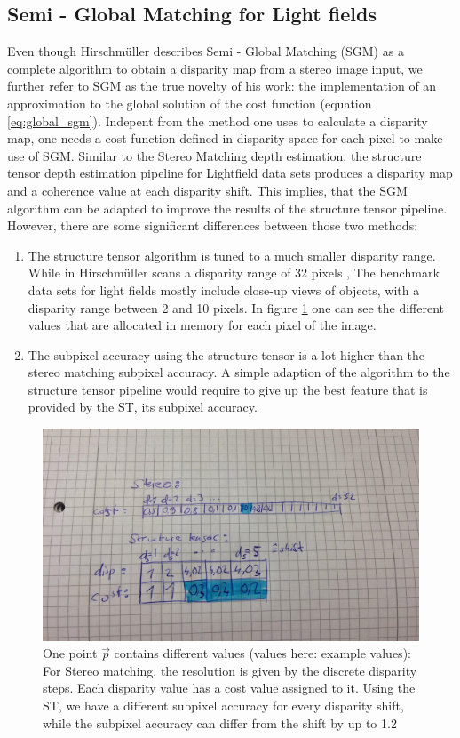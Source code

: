 \documentclass  [
  paper    = a4,
  BCOR     = 10mm,
  twoside,
  fontsize = 12pt,
  fleqn,
  toc      = bibnumbered,
  toc      = listofnumbered,
  numbers  = noendperiod,
  headings = normal,
  listof   = leveldown,
  version  = 3.03
]                                       {scrreprt}
\begin{document}
\subsection{Semi - Global Matching for Light fields}
Even though Hirschmüller describes Semi - Global Matching (SGM) as a complete algorithm to obtain a disparity map from a stereo image input, we further refer to SGM as the true novelty of his work: the implementation of an approximation to the global solution of the cost function (equation \ref{eq:global_sgm}). Indepent from the method one uses to calculate a disparity map,  one needs a cost function defined in disparity space for each pixel to make use of SGM. 
Similar to the Stereo Matching depth estimation, the structure tensor depth estimation pipeline for Lightfield data sets produces a disparity map and a coherence value at each disparity shift. This implies, that the SGM algorithm can be adapted to improve the results of the structure tensor pipeline. However, there are some significant differences between those two methods:
\begin{enumerate}
	\item The structure tensor algorithm is tuned to a much smaller disparity range. While in \cite{hirschmuller2005accurate} Hirschmüller scans a disparity range of 32 pixels , The benchmark data sets for light fields mostly include close-up views of objects, with a disparity range between 2 and 10 pixels. In figure \ref{fig:table-skizze} one can see the different values that are allocated in memory for each pixel of the image.
	\item The subpixel accuracy using the structure tensor is a lot higher than the stereo matching subpixel accuracy. A simple adaption of the algorithm to the structure tensor pipeline would require to give up the best feature that is provided by the ST, its subpixel accuracy.
\end{enumerate}
\begin{figure}[h]
	\centering
	\includegraphics[width=0.7\linewidth]{images/table-skizze}
	\caption[Example values: One point $\vec p$ contains different values]{One point $\vec p$ contains different values (values here: example values): For Stereo matching, the resolution is given by the discrete disparity steps. Each disparity value has a cost value assigned to it. Using the ST, we have a different subpixel accuracy for every disparity shift, while the subpixel accuracy can differ from the shift by up to 1.2 }
	\label{fig:table-skizze}
\end{figure}
\end{document}
